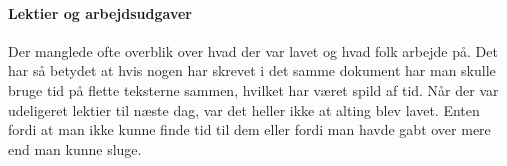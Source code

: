 \paragraph{Lektier og arbejdsudgaver}
Der manglede ofte overblik over hvad der var lavet og hvad folk arbejde på. Det har så betydet at hvis nogen har skrevet i det samme dokument har man skulle bruge tid på flette teksterne sammen, hvilket har været spild af tid. Når der var udeligeret lektier til næste dag, var det heller ikke at alting blev lavet. Enten fordi at man ikke kunne finde tid til dem eller fordi man havde gabt over mere end man kunne sluge. 